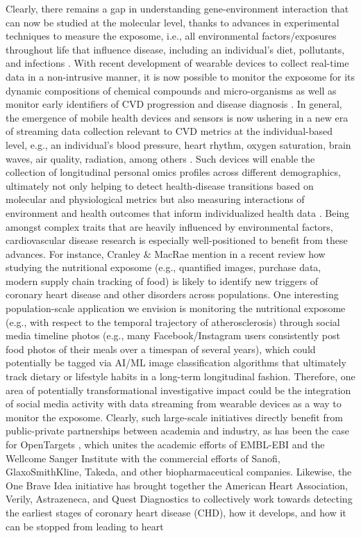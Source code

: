 \documentclass[letter]{bib}
\begin{document}
	Clearly, there remains a gap in understanding gene-environment interaction that can now be studied at the molecular level, thanks to advances in experimental techniques to measure the exposome, i.e., all environmental factors/exposures throughout life that influence disease, including an individual's diet, pollutants, and infections \citep{Wild:2005:Complementing}. With recent development of wearable devices to collect real-time data in a non-intrusive manner, it is now possible to monitor the exposome for its dynamic compositions of chemical compounds and micro-organisms \citep{Warth:2017:ExposomeScale, Jiang:2018:Dynamic} as well as monitor early identifiers of CVD progression \citep{McConnell:2017:Feasibility,Shah:2015:phenomapping} and disease diagnosis \citep{Li:2017:Digital}.  In general, the emergence of mobile health devices and sensors is now ushering in a new era of streaming data collection relevant to CVD metrics at the individual-based level, e.g., an individual's blood pressure, heart rhythm, oxygen saturation, brain waves, air quality, radiation, among others \citep{Kellogg:2018:Personal}.  Such devices will enable the collection of longitudinal personal omics profiles across different demographics, ultimately not only helping to detect health-disease transitions based on molecular and physiological metrics but also measuring interactions of environment and health outcomes that inform individualized health data \citep{Kellogg:2018:Personal}.  Being amongst complex traits that are heavily influenced by environmental factors, cardiovascular disease research is especially well-positioned to benefit from these advances.  For instance, Cranley \& MacRae mention in a recent review \citep{Cranley:2018:New} how studying the nutritional exposome (e.g., quantified images, purchase data, modern supply chain tracking of food) is likely to identify new triggers of coronary heart disease and other disorders across populations.  One interesting population-scale application we envision is monitoring the nutritional exposome (e.g., with respect to the temporal trajectory of atherosclerosis) through social media timeline photos (e.g., many Facebook/Instagram users consistently post food photos of their meals over a timespan of several years), which could potentially be tagged via AI/ML image classification algorithms that ultimately track dietary or lifestyle habits in a long-term longitudinal fashion.  Therefore, one area of potentially transformational investigative impact could be the integration of social media activity with data streaming from wearable devices as a way to monitor the exposome.  Clearly, such large-scale initiatives directly benefit from public-private partnerships between academia and industry, as has been the case for OpenTargets \citep{Koscielny:2017:Open}, which unites the academic efforts of EMBL-EBI and the Wellcome Sanger Institute with the commercial efforts of Sanofi, GlaxoSmithKline, Takeda, and other biopharmaceutical companies.  Likewise, the One Brave Idea initiative \citep{OneBraveIdea:2019} has brought together the American Heart Association, Verily, Astrazeneca, and Quest Diagnostics to collectively work towards detecting the earliest stages of coronary heart disease (CHD), how it develops, and how it can be stopped from leading to heart 
\end{document}
